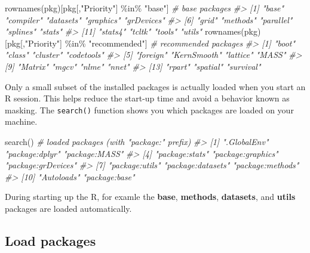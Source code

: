 \documentclass[
]{book}
\newenvironment{Shaded}{\begin{snugshade}}{\end{snugshade}}
\newcommand{\CommentTok}[1]{\textcolor[rgb]{0.56,0.35,0.01}{\textit{#1}}}
\newcommand{\FunctionTok}[1]{\textcolor[rgb]{0.00,0.00,0.00}{#1}}
\newcommand{\NormalTok}[1]{#1}
\newcommand{\SpecialCharTok}[1]{\textcolor[rgb]{0.00,0.00,0.00}{#1}}
\newcommand{\StringTok}[1]{\textcolor[rgb]{0.31,0.60,0.02}{#1}}
\begin{document}
\begin{Shaded}
\begin{Highlighting}[]
\FunctionTok{rownames}\NormalTok{(pkg)[pkg[,}\StringTok{"Priority"}\NormalTok{] }\SpecialCharTok{\%in\%} \StringTok{"base"}\NormalTok{]         }\CommentTok{\# base packages}
\CommentTok{\#\textgreater{}  [1] "base"      "compiler"  "datasets"  "graphics"  "grDevices"}
\CommentTok{\#\textgreater{}  [6] "grid"      "methods"   "parallel"  "splines"   "stats"    }
\CommentTok{\#\textgreater{} [11] "stats4"    "tcltk"     "tools"     "utils"}
\FunctionTok{rownames}\NormalTok{(pkg)[pkg[,}\StringTok{"Priority"}\NormalTok{] }\SpecialCharTok{\%in\%} \StringTok{"recommended"}\NormalTok{]  }\CommentTok{\# recommended packages}
\CommentTok{\#\textgreater{}  [1] "boot"       "class"      "cluster"    "codetools" }
\CommentTok{\#\textgreater{}  [5] "foreign"    "KernSmooth" "lattice"    "MASS"      }
\CommentTok{\#\textgreater{}  [9] "Matrix"     "mgcv"       "nlme"       "nnet"      }
\CommentTok{\#\textgreater{} [13] "rpart"      "spatial"    "survival"}
\end{Highlighting}
\end{Shaded}

Only a small subset of the installed packages is actually loaded when you start an R session. This helps reduce the start-up time and avoid a behavior known as masking. The \texttt{search()} function shows you which packages are loaded on your machine.

\begin{Shaded}
\begin{Highlighting}[]
\FunctionTok{search}\NormalTok{()  }\CommentTok{\# loaded packages (with "package:" prefix)}
\CommentTok{\#\textgreater{}  [1] ".GlobalEnv"        "package:dplyr"     "package:MASS"     }
\CommentTok{\#\textgreater{}  [4] "package:stats"     "package:graphics"  "package:grDevices"}
\CommentTok{\#\textgreater{}  [7] "package:utils"     "package:datasets"  "package:methods"  }
\CommentTok{\#\textgreater{} [10] "Autoloads"         "package:base"}
\end{Highlighting}
\end{Shaded}

During starting up the R, for examle the \textbf{base}, \textbf{methods}, \textbf{datasets}, and \textbf{utils} packages are loaded automatically.

\hypertarget{load-packages}{%
\subsection{Load packages}\label{load-packages}}
\end{document}
